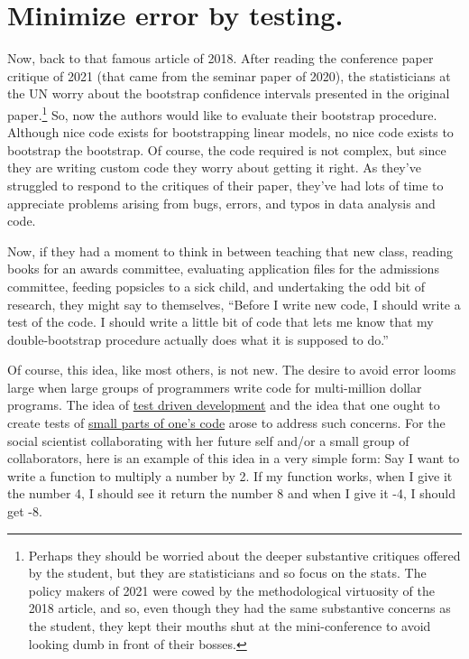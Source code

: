 \documentclass[12pt]{article}
\begin{document}


\section{Minimize error by testing.}

Now, back to that famous article of 2018. After reading the conference
paper critique of 2021 (that came from the seminar paper of 2020), the
statisticians at the UN worry about the bootstrap confidence intervals
presented in the original paper.\footnote{Perhaps they should be
  worried about the deeper substantive critiques offered by the
  student, but they are statisticians and so focus on the stats. The
  policy makers of 2021 were cowed by the methodological virtuosity of
  the 2018 article, and so, even though they had the same substantive
  concerns as the student, they kept their mouths shut at the
  mini-conference to avoid looking dumb in front of their bosses.} So,
now the authors would like to evaluate their bootstrap procedure. Although
nice code exists for bootstrapping linear models, no nice code exists
to bootstrap the bootstrap. Of course, the code required is not
complex, but since they are writing custom code they worry about
getting it right. As they've struggled to respond to the critiques of
their paper, they've had lots of time to appreciate problems arising
from bugs, errors, and typos in data analysis and code.

Now, if they had a moment to think in between teaching that new class,
reading books for an awards committee, evaluating application files
for the admissions committee, feeding popsicles to a sick child, and
undertaking the odd bit of research, they might say to themselves,
``Before I write new code, I should write a test of the code. I should
write a little bit of code that lets me know that my double-bootstrap
procedure actually does what it is supposed to do.''

Of course, this idea, like most others, is not new. The desire to
avoid error looms large when large groups of programmers write code
for multi-million dollar programs. The idea of
\href{http://en.wikipedia.org/wiki/Test-driven_development}{test
  driven development} and the idea that one ought to create tests of
\href{http://en.wikipedia.org/wiki/Unit_testing}{small parts of one's
  code} arose to address such concerns. For the social scientist
collaborating with her future self and/or a small group of
collaborators, here is an example of this idea in a very simple form:
Say I want to write a function to multiply a number by 2. If my
function works, when I give it the number 4, I should see it return
the number 8 and when I give it -4, I should get -8.
\end{document}
